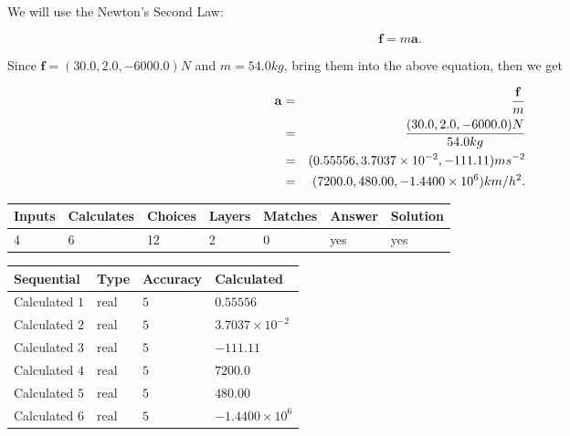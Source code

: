 \documentclass[12pt]{article}
\begin{document}
 

We will use the Newton's Second Law:
 
\[
\mathbf{f}=m\mathbf{a}.
\]
 
Since $\mathbf{f}=( %
30.0,  %
2.0,  %
-6000.0 )N$
and $m= %
54.0 kg$, bring them into the above equation, then we get
 
\begin{eqnarray*}
\mathbf{a}&=&\frac{\mathbf{f}}m  \\
&=&\frac{(
30.0 ,
2.0 ,
-6000.0 )N
}{ %
54.0 kg}  \\
&=&(
0.55556 ,
3.7037 \times 10^{-2},
-111.11
)ms^{-2} \\
&=&(
7200.0 ,
480.00 ,
-1.4400 \times 10^{6}
)km/h^2.
\end{eqnarray*}
 
 
 
\noindent{}
 
 

 
 
\vspace{0.3in}
   
   
   
   
\noindent\begin{tabular}{|l|l|l|l|l|l|l|}
 \hline
Inputs & Calculates & Choices & Layers & Matches & Answer & Solution \\ \hline
           4  & 
           6  & 
          12
  & 
           2  & 
           0  & 
  yes & 
  yes 
  \\ \hline
 \end{tabular}
   
   
   
   
\noindent{}
   
   
  
  
\noindent\begin{tabular}{|l|l|l|l|}
\hline
 Sequential & Type & Accuracy & Calculated \\ 
\hline
 
 
  Calculated $            1 $ & real & $            5  $ & 
 $ 0.55556 $ 
 \\  \hline  
 
 
  Calculated $            2 $ & real & $            5  $ & 
 $ 3.7037 \times 10^{-2} $ 
 \\  \hline  
 
 
  Calculated $            3 $ & real & $            5  $ & 
 $ -111.11 $ 
 \\  \hline  
 
 
  Calculated $            4 $ & real & $            5  $ & 
 $ 7200.0 $ 
 \\  \hline  
 
 
  Calculated $            5 $ & real & $            5  $ & 
 $ 480.00 $ 
 \\  \hline  
 
 
  Calculated $            6 $ & real & $            5  $ & 
 $ -1.4400 \times 10^{6} $ 
 \\  \hline  
 \end{tabular}
   
\end{document}

